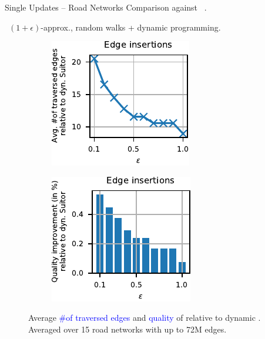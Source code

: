 \documentclass[10pt,titlepage,english,presentation]{beamer}
\newcommand{\emphcolor}{blue}
\renewcommand{\emph}[1]{\textcolor{\emphcolor}{#1}}
\begin{document}
\begin{frame}[t]{Single Updates -- Road Networks}
\small
Comparison against \dynmwmrandom~\parencite{conf/acda/AngrimanMSU21}.\smallskip

\quad\faHandORight\ $(1 + \epsilon)$-approx., random walks + dynamic programming.
\medskip

\begin{figure}
\centering
\begin{subfigure}[t]{.5\textwidth}
\centering
\includegraphics[width=.7\textwidth]{../sources/plots/dyn-mwm/rw-insertion-road-vedges.pdf}
\end{subfigure}\hfill
\begin{subfigure}[t]{.5\textwidth}
\centering
\includegraphics[width=.7\textwidth]{../sources/plots/dyn-mwm/rw-insertion-road-qual.pdf}
\end{subfigure}
\caption*{\footnotesize Average \emph{\#of traversed edges} and \emph{quality} of
\dynmwmrandom relative to dynamic \suitor. Averaged over 15 road networks with
up to 72M edges.}
\end{figure}\pause


\end{frame}
\end{document}
